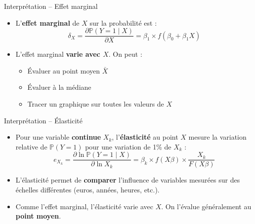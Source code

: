 \documentclass[11pt,aspectratio=169]{beamer}
\newcommand{\PP}{\mathbb{P}}
\begin{document}
\begin{frame}{Interprétation -- Effet marginal}

\begin{itemize}

\item L'\textbf{effet marginal} de $X$ sur la probabilité est :
  \[
  \delta_X = \frac{\partial \PP(Y=1 \mid X)}{\partial X} = \beta_1 \times f(\beta_0 + \beta_1 X)
  \]

\item L'effet marginal \textbf{varie avec $X$}. On peut :
  \begin{itemize}
  \item Évaluer au point moyen $\bar{X}$\newline
  \item Évaluer à la médiane\newline
  \item Tracer un graphique sur toutes les valeurs de $X$
  \end{itemize}

\end{itemize}

\end{frame}

\begin{frame}{Interprétation -- Élasticité}

\begin{itemize}

\item Pour une variable \textbf{continue} $X_k$, l'\textbf{élasticité} au
  point $X$ mesure la variation relative de $\PP(Y=1)$ pour une variation
  de 1\% de $X_k$ :
  \[
  e_{X_k} = \frac{\partial \ln \PP(Y=1 \mid X)}{\partial \ln X_k} = \beta_k \times f(X\beta) \times \frac{X_k}{F(X\beta)}
  \]

\item L'élasticité permet de \textbf{comparer} l'influence de variables
  mesurées sur des échelles différentes (euros, années, heures,
  etc.).\newline

\item Comme l'effet marginal, l'élasticité varie avec $X$. On l'évalue
  généralement au \textbf{point moyen}.

\end{itemize}

\end{frame}
\end{document}
